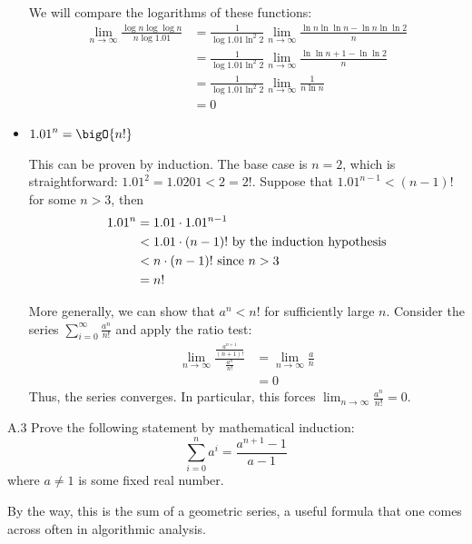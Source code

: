 \documentclass[draft]{article}
\begin{document}
\begin{solution}
\begin{itemize}
              We will compare the logarithms of these functions:
              \begin{align*}\lim_{n\to\infty}\frac{\log{n}\log\log{n}}{n\log{1.01}}
                   & = \frac{1}{\log{1.01}\ln^2{2}}\lim_{n\to\infty}\frac{\ln{n}\ln\ln{n} - \ln{n}\ln\ln{2}}{n} \\
                   & = \frac{1}{\log{1.01}\ln^2{2}}\lim_{n\to\infty}\frac{\ln\ln{n} + 1 - \ln\ln{2}}{n}         \\
                   & = \frac{1}{\log{1.01}\ln^2{2}}\lim_{n\to\infty}\frac{1}{n\ln{n}}                           \\
                   & = 0
              \end{align*}

        \item $\displaystyle {1.01}^n = \bigO{n!}$

              This can be proven by induction. The base case is $n = 2$, which is straightforward: $1.01^2 = 1.0201 < 2 = 2!$. Suppose that ${1.01}^{n - 1} < (n - 1)!$ for some $n > 3$, then
              \begin{align*}{1.01}^n
                   & = 1.01 \cdot {1.01}^{n - 1}                               \\
                   & < 1.01 \cdot (n - 1)! \hbox{ by the induction hypothesis} \\
                   & < n \cdot (n - 1)! \hbox{ since $n > 3$}                  \\
                   & = n!
              \end{align*}

              More generally, we can show that $a^n < n!$ for sufficiently large $n$. Consider the series $\sum_{i=0}^{\infty}\frac{a^n}{n!}$ and apply the ratio test:
              \begin{align*}\lim_{n\to\infty}\frac{\frac{a^{n + 1}}{(n + 1)!}}{\frac{a^n}{n!}}
                   & = \lim_{n\to\infty}\frac{a}{n} \\
                   & = 0
              \end{align*}
              Thus, the series converges. In particular, this forces $\lim_{n\to\infty}\frac{a^n}{n!} = 0$.
    \end{itemize}
\end{solution}

\begin{exercise}{A.3}
    Prove the following statement by mathematical induction:
    \[\sum_{i=0}^n a^i = \frac{a^{n+1} - 1}{a-1}\] where $a \neq 1$
    is some fixed real number.

    By the way, this is the sum of a geometric series, a useful
    formula that one comes across often in algorithmic analysis.
\end{exercise}
\end{document}
